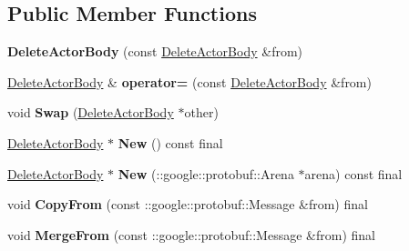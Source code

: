 \subsection*{Public Member Functions}
\begin{DoxyCompactItemize}
\item 
\mbox{\label{classtbBasics_1_1DeleteActorBody_accff4e03f84be0dd6e328c4b746296d9}} 
{\bfseries Delete\+Actor\+Body} (const \hyperlink{classtbBasics_1_1DeleteActorBody}{Delete\+Actor\+Body} \&from)
\item 
\mbox{\label{classtbBasics_1_1DeleteActorBody_ab8118e7bfeb89b8e3bf1b40d923729c2}} 
\hyperlink{classtbBasics_1_1DeleteActorBody}{Delete\+Actor\+Body} \& {\bfseries operator=} (const \hyperlink{classtbBasics_1_1DeleteActorBody}{Delete\+Actor\+Body} \&from)
\item 
\mbox{\label{classtbBasics_1_1DeleteActorBody_a5e0ab8c99b24c5b6b1429409b41b2286}} 
void {\bfseries Swap} (\hyperlink{classtbBasics_1_1DeleteActorBody}{Delete\+Actor\+Body} $\ast$other)
\item 
\mbox{\label{classtbBasics_1_1DeleteActorBody_a4018ec1e6951c0f9a8c0345ed4929710}} 
\hyperlink{classtbBasics_1_1DeleteActorBody}{Delete\+Actor\+Body} $\ast$ {\bfseries New} () const final
\item 
\mbox{\label{classtbBasics_1_1DeleteActorBody_a2549f60a80839599a50ae4781c250ecc}} 
\hyperlink{classtbBasics_1_1DeleteActorBody}{Delete\+Actor\+Body} $\ast$ {\bfseries New} (\+::google\+::protobuf\+::\+Arena $\ast$arena) const final
\item 
\mbox{\label{classtbBasics_1_1DeleteActorBody_a8ea7c420a491d3c6279c85b1a14b4e68}} 
void {\bfseries Copy\+From} (const \+::google\+::protobuf\+::\+Message \&from) final
\item 
\mbox{\label{classtbBasics_1_1DeleteActorBody_a37588befa16fae702fdad8368f580ead}} 
void {\bfseries Merge\+From} (const \+::google\+::protobuf\+::\+Message \&from) final
\item 
\mbox{\label{classtbBasics_1_1DeleteActorBody_a3d2a9f2664ea9833030edad0c9abb8cf}} 

\end{DoxyCompactItemize}
